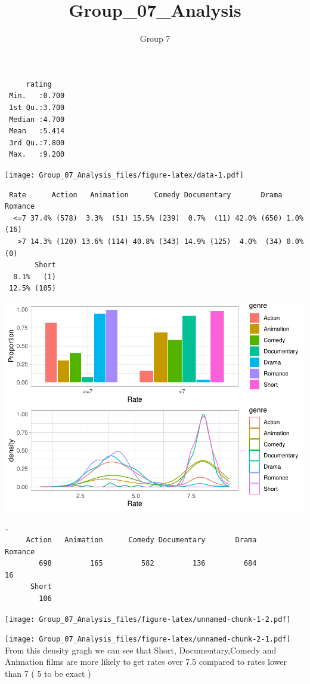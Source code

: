 \documentclass[
]{article}
\title{Group\_07\_Analysis}
\author{Group 7}
\date{}
\begin{document}
\maketitle

\begin{verbatim}
     rating     
 Min.   :0.700  
 1st Qu.:3.700  
 Median :4.700  
 Mean   :5.414  
 3rd Qu.:7.800  
 Max.   :9.200  
\end{verbatim}

\texttt{[image: Group\_07\_Analysis\_files/figure-latex/data-1.pdf]}

\begin{verbatim}
 Rate      Action   Animation      Comedy Documentary       Drama   Romance
  <=7 37.4% (578)  3.3%  (51) 15.5% (239)  0.7%  (11) 42.0% (650) 1.0% (16)
   >7 14.3% (120) 13.6% (114) 40.8% (343) 14.9% (125)  4.0%  (34) 0.0%  (0)
       Short
  0.1%   (1)
 12.5% (105)
\end{verbatim}

\includegraphics{Group_07_Analysis_files/figure-latex/unnamed-chunk-1-1.pdf}

\begin{verbatim}
.
     Action   Animation      Comedy Documentary       Drama     Romance 
        698         165         582         136         684          16 
      Short 
        106 
\end{verbatim}

\texttt{[image: Group\_07\_Analysis\_files/figure-latex/unnamed-chunk-1-2.pdf]}

\texttt{[image: Group\_07\_Analysis\_files/figure-latex/unnamed-chunk-2-1.pdf]}
From this density gragh we can see that Short, Documentary,Comedy and
Animation films are more likely to get rates over 7.5 compared to rates
lower than 7 ( 5 to be exact )
\end{document}

